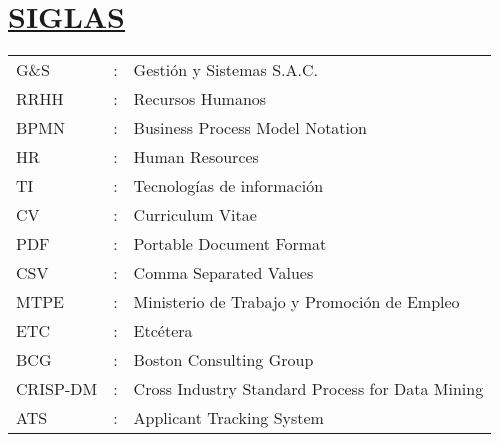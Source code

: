 \section*{\textbf{\underline{SIGLAS}}}

\begin{tabular}{L{2 cm}p{0.025 cm}p{11.7 cm}}
G\&S & : & Gestión y Sistemas S.A.C.\\
RRHH & : & Recursos Humanos\\
BPMN & : & Business Process Model Notation\\
HR & : & Human Resources\\
TI & : & Tecnologías de información\\
CV & : & Curriculum Vitae\\
PDF & : & Portable Document Format\\
CSV & : & Comma Separated Values\\
MTPE & : & Ministerio de Trabajo y Promoción de Empleo\\
ETC & : & Etcétera\\
BCG & : & Boston Consulting Group\\
CRISP-DM & : & Cross Industry Standard Process for Data Mining\\
ATS & : & Applicant Tracking System\\
\end{tabular}\\
